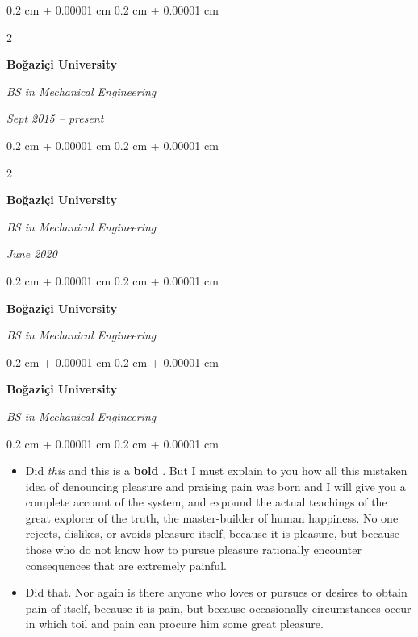 \documentclass[10pt, letterpaper]{article}
\newenvironment{highlights}{
    \begin{itemize}[
        topsep=0.10 cm,
        parsep=0.10 cm,
        partopsep=0pt,
        itemsep=0pt,
        leftmargin=0.4 cm + 10pt
    ]
}{
    \end{itemize}
} %
\newenvironment{onecolentry}{
    \begin{adjustwidth}{
        0.2 cm + 0.00001 cm
    }{
        0.2 cm + 0.00001 cm
    }
}{
    \end{adjustwidth}
} %
\newenvironment{twocolentry}[2][]{
    \onecolentry
    \def\secondColumn{#2}
    \setcolumnwidth{\fill, 4.5 cm}
    \begin{paracol}{2}
}{
    \switchcolumn \raggedleft \secondColumn
    \end{paracol}
    \endonecolentry
} %
\let\hrefWithoutArrow\href
\renewcommand{\href}[2]{\hrefWithoutArrow{#1}{\ifthenelse{\equal{#2}{}}{ }{#2 }\raisebox{.15ex}{\footnotesize \faExternalLink*}}}
\begin{document}
        \vspace{0.2 cm}

        \begin{twocolentry}{
            
            
        \textit{Sept 2015 – present}}
            \textbf{Boğaziçi University}

            \textit{BS in Mechanical Engineering}
        \end{twocolentry}



        \vspace{0.2 cm}

        \begin{twocolentry}{
            
            
        \textit{June 2020}}
            \textbf{Boğaziçi University}

            \textit{BS in Mechanical Engineering}
        \end{twocolentry}



        \vspace{0.2 cm}

        \begin{onecolentry}
            \textbf{Boğaziçi University}

            \textit{BS in Mechanical Engineering}
        \end{onecolentry}



        \vspace{0.2 cm}

        \begin{onecolentry}
            \textbf{Boğaziçi University}

            \textit{BS in Mechanical Engineering}
        \end{onecolentry}

        \vspace{0.10 cm}
        \begin{onecolentry}
            \begin{highlights}
                \item Did \textit{this} and this is a \textbf{bold} \href{https://example.com}{link}. But I must explain to you how all this mistaken idea of denouncing pleasure and praising pain was born and I will give you a complete account of the system, and expound the actual teachings of the great explorer of the truth, the master-builder of human happiness. No one rejects, dislikes, or avoids pleasure itself, because it is pleasure, but because those who do not know how to pursue pleasure rationally encounter consequences that are extremely painful.
                \item Did that. Nor again is there anyone who loves or pursues or desires to obtain pain of itself, because it is pain, but because occasionally circumstances occur in which toil and pain can procure him some great pleasure.
            \end{highlights}
        \end{onecolentry}
\end{document}

